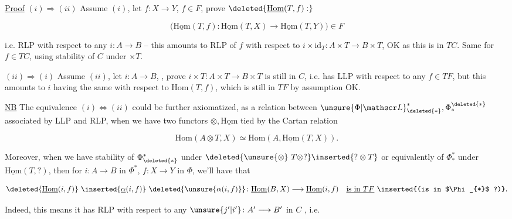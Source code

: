 

\uline{Proof} $(i)\Longrightarrow(ii)$ Assume $(i)$, let $f\colon X\longrightarrow Y$, $f\in F$, prove $\deleted{\underline{\mathrm{Hom}}(T,f):}$

\[
\bigl(\underline{\mathrm{Hom}}(T,f)\colon\underline{\mathrm{Hom}}(T,X)\longrightarrow\underline{\mathrm{Hom}}(T,Y)\bigr)\in F
\]

i.e. RLP with respect to any $i\colon A\longrightarrow B$  -- this amounts to RLP of $f$ with respect to $i\times\mathrm{id}_T\colon A\times T\longrightarrow B\times T$, OK as this is  in $TC$. Same for $f\in TC$, using stability of $C$ under $\times T$.

$(ii)\Longrightarrow(i)$ Assume $(ii)$, let $i\colon A\longrightarrow B$,  , prove $i\times T\colon A\times T\longrightarrow B\times T$ is still in $C$, i.e. has  LLP with respect to any $f\in TF$, but this amounts to $i$ having the same with respect to $\mathrm{Hom}(T,f)$, which is still in $TF$ by assumption OK.

 \uline{NB} The equivalence $(i)\Leftrightarrow(ii)$ could be further axiomatized, as a relation between $\unsure{\Phi|\mathscr L}^{*}_{\deleted{*}},\Phi^{\deleted{*}}_{*}$ associated by LLP and RLP, when we have two functors $\otimes,\underline{\mathrm{Hom}}$ tied by the Cartan relation

\[
\mathrm{Hom}(A\otimes T,X)\simeq\mathrm{Hom}(A,\underline{\mathrm{Hom}}(T,X)).
\]


Moreover, when we have stability of $\Phi_{\deleted{*}}^{*}$ under $\deleted{\unsure{\otimes}\ T\otimes ?}\inserted{?\otimes T}$  or equivalently of $\Phi^{*}_{*}$ under $\underline{\mathrm{Hom}}(T,?)$, then for $i\colon A\longrightarrow B$ in $\Phi^{*}$, $f\colon X\longrightarrow Y$ in $\Phi$, we'll have that

\[
\deleted{\underline{\mathrm{Hom}}(i,f)}\ \inserted{\underline{\alpha}(i,f)}\ \deleted{\unsure{\alpha(i,f)}}\colon
\underline{\mathrm{Hom}}(B,X)\longrightarrow\underline{\mathrm{Hom}}(i,f)
\quad\underline{\text{is in }TF}\ \text{\inserted{(is in $\Phi_{*}$ ?)}}.
\]

Indeed, this means it has RLP with respect to any $\unsure{j'|i'}\colon A'\longrightarrow B'$ in $C$ \inserted{[$\Phi^{*}$]}, i.e.

